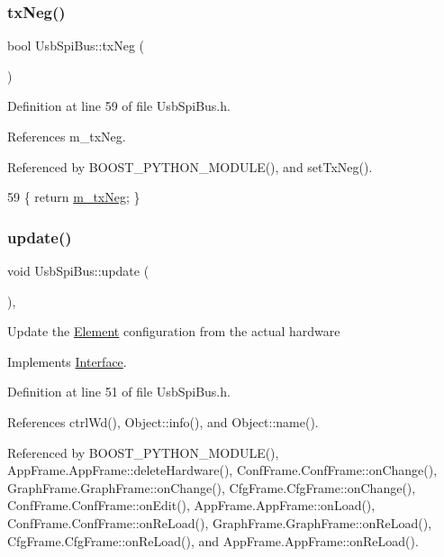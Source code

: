 \subsubsection{\texorpdfstring{tx\+Neg()}{txNeg()}}
{\footnotesize\ttfamily bool Usb\+Spi\+Bus\+::tx\+Neg (\begin{DoxyParamCaption}{ }\end{DoxyParamCaption})\hspace{0.3cm}{\ttfamily [inline]}}



Definition at line 59 of file Usb\+Spi\+Bus.\+h.



References m\+\_\+tx\+Neg.



Referenced by B\+O\+O\+S\+T\+\_\+\+P\+Y\+T\+H\+O\+N\+\_\+\+M\+O\+D\+U\+L\+E(), and set\+Tx\+Neg().


\begin{DoxyCode}
59 \{ \textcolor{keywordflow}{return} \hyperlink{classUsbSpiBus_a48528e7dcb036ecc1732581a89e16d10}{m\_txNeg}; \}
\end{DoxyCode}
\mbox{\label{classUsbSpiBus_a3e26195827351bf88db56dafd1e7de26}} 
\subsubsection{\texorpdfstring{update()}{update()}}
{\footnotesize\ttfamily void Usb\+Spi\+Bus\+::update (\begin{DoxyParamCaption}{ }\end{DoxyParamCaption})\hspace{0.3cm}{\ttfamily [inline]}, {\ttfamily [virtual]}}

Update the \hyperlink{classElement}{Element} configuration from the actual hardware 

Implements \hyperlink{classInterface_a30e71ffbe36091df9f7c0838dd4b60d2}{Interface}.



Definition at line 51 of file Usb\+Spi\+Bus.\+h.



References ctrl\+Wd(), Object\+::info(), and Object\+::name().



Referenced by B\+O\+O\+S\+T\+\_\+\+P\+Y\+T\+H\+O\+N\+\_\+\+M\+O\+D\+U\+L\+E(), App\+Frame.\+App\+Frame\+::delete\+Hardware(), Conf\+Frame.\+Conf\+Frame\+::on\+Change(), Graph\+Frame.\+Graph\+Frame\+::on\+Change(), Cfg\+Frame.\+Cfg\+Frame\+::on\+Change(), Conf\+Frame.\+Conf\+Frame\+::on\+Edit(), App\+Frame.\+App\+Frame\+::on\+Load(), Conf\+Frame.\+Conf\+Frame\+::on\+Re\+Load(), Graph\+Frame.\+Graph\+Frame\+::on\+Re\+Load(), Cfg\+Frame.\+Cfg\+Frame\+::on\+Re\+Load(), and App\+Frame.\+App\+Frame\+::on\+Re\+Load().


